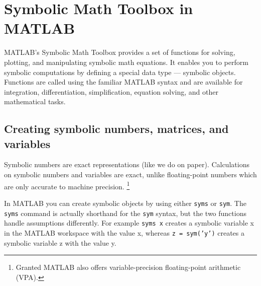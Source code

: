 \section[Symbolic Math Toolbox in MATLAB]{Symbolic Math Toolbox in MATLAB\label{ex:MatlabSymbolicToolbox}}
MATLAB's Symbolic Math Toolbox provides a set of functions for solving, plotting, and manipulating symbolic math equations.
It enables you to perform symbolic computations by defining a special data type — symbolic objects.
Functions are called using the familiar MATLAB syntax
  and are available for integration, differentiation, simplification, equation solving, and other mathematical tasks.

\subsection*{Creating symbolic numbers, matrices, and variables}
Symbolic numbers are exact representations (like we do on paper).
  Calculations on symbolic numbers and variables are exact,
  unlike floating-point numbers which are only accurate to machine precision.
\footnote{Granted MATLAB also offers variable-precision floating-point arithmetic (VPA).}

In MATLAB you can create symbolic objects by using either \texttt{syms} or \texttt{sym}.
The \texttt{syms} command is actually shorthand for the \texttt{sym} syntax,
  but the two functions handle assumptions differently.
For example \texttt{syms x} creates a symbolic variable x in the MATLAB workspace with the value x,
  whereas \texttt{z = sym('y')} creates a symbolic variable z with the value y.

